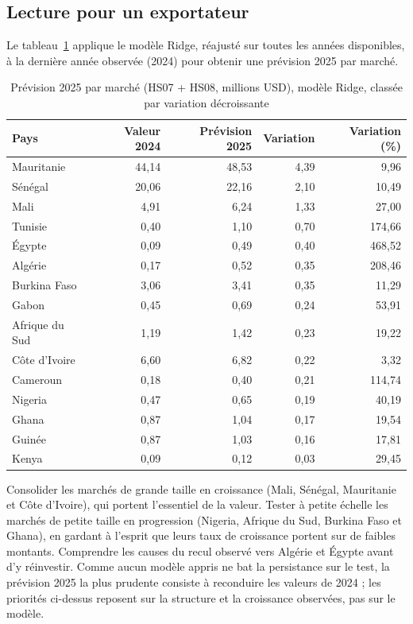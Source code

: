 \documentclass[11pt,a4paper]{article}
\begin{document}
\subsection{Lecture pour un exportateur}
Le tableau~\ref{tab:prev} applique le modèle Ridge, réajusté sur toutes les années disponibles, à la dernière année observée (2024) pour obtenir une prévision 2025 par marché.
\begin{table}[H]\centering\small
\caption{Prévision 2025 par marché (HS07 + HS08, millions USD), modèle Ridge, classée par variation décroissante}\label{tab:prev}
\begin{tabular}{lrrrr}\toprule
Pays & Valeur 2024 & Prévision 2025 & Variation & Variation (\%) \\ \midrule
Mauritanie & 44,14 & 48,53 & 4,39 & 9,96 \\
Sénégal & 20,06 & 22,16 & 2,10 & 10,49 \\
Mali & 4,91 & 6,24 & 1,33 & 27,00 \\
Tunisie & 0,40 & 1,10 & 0,70 & 174,66 \\
Égypte & 0,09 & 0,49 & 0,40 & 468,52 \\
Algérie & 0,17 & 0,52 & 0,35 & 208,46 \\
Burkina Faso & 3,06 & 3,41 & 0,35 & 11,29 \\
Gabon & 0,45 & 0,69 & 0,24 & 53,91 \\
Afrique du Sud & 1,19 & 1,42 & 0,23 & 19,22 \\
Côte d'Ivoire & 6,60 & 6,82 & 0,22 & 3,32 \\
Cameroun & 0,18 & 0,40 & 0,21 & 114,74 \\
Nigeria & 0,47 & 0,65 & 0,19 & 40,19 \\
Ghana & 0,87 & 1,04 & 0,17 & 19,54 \\
Guinée & 0,87 & 1,03 & 0,16 & 17,81 \\
Kenya & 0,09 & 0,12 & 0,03 & 29,45 \\
\bottomrule\end{tabular}
\end{table}
Consolider les marchés de grande taille en croissance (Mali, Sénégal, Mauritanie et Côte d'Ivoire), qui portent l'essentiel de la valeur. Tester à petite échelle les marchés de petite taille en progression (Nigeria, Afrique du Sud, Burkina Faso et Ghana), en gardant à l'esprit que leurs taux de croissance portent sur de faibles montants. Comprendre les causes du recul observé vers Algérie et Égypte avant d'y réinvestir. Comme aucun modèle appris ne bat la persistance sur le test, la prévision 2025 la plus prudente consiste à reconduire les valeurs de 2024 ; les priorités ci-dessus reposent sur la structure et la croissance observées, pas sur le modèle.
\end{document}
